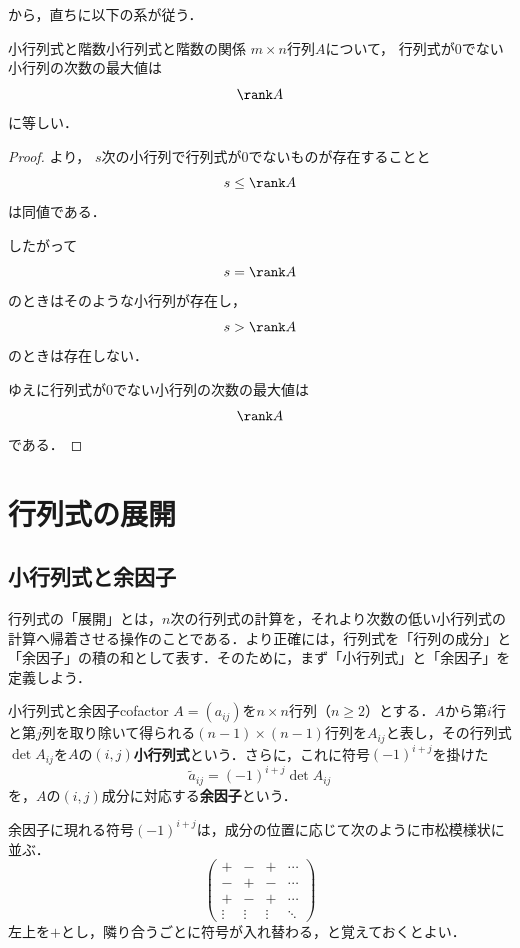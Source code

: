 から，直ちに以下の系が従う．

\begin{cor}{小行列式と階数}{小行列式と階数の関係}
  $m\times n$行列$A$について，
  行列式が$0$でない小行列の次数の最大値は
  \[
    \rank A
  \]
  に等しい．
\end{cor}

\begin{leftbar}
\begin{proof}
より，
$s$次の小行列で行列式が$0$でないものが存在することと
\[
s\le \rank A
\]
は同値である．

したがって
\[
s=\rank A
\]
のときはそのような小行列が存在し，
\[
s>\rank A
\]
のときは存在しない．

ゆえに行列式が$0$でない小行列の次数の最大値は
\[
\rank A
\]
である．
\end{proof}
\end{leftbar}

\section{行列式の展開}

\subsection{小行列式と余因子}

行列式の「展開」とは，$n$次の行列式の計算を，それより次数の低い小行列式の計算へ帰着させる操作のことである．より正確には，行列式を「行列の成分」と「余因子」の積の和として表す．そのために，まず「小行列式」と「余因子」を定義しよう．

\begin{definition}{小行列式と余因子}{cofactor}
  $A = (a_{ij})$を$n \times n$行列（$n \geq 2$）とする．$A$から第$i$行と第$j$列を取り除いて得られる$(n-1) \times (n-1)$行列を$A_{ij}$と表し，その行列式$\det A_{ij}$を$A$の$(i,j)$\textbf{小行列式}という．さらに，これに符号$(-1)^{i+j}$を掛けた
  \[
  \tilde{a}_{ij} = (-1)^{i+j} \det A_{ij}
  \]
  を，$A$の$(i,j)$成分に対応する\textbf{余因子}という．
\end{definition}

余因子に現れる符号$(-1)^{i+j}$は，成分の位置に応じて次のように市松模様状に並ぶ．
\[
\begin{pmatrix}
  + & - & + & \cdots \\
  - & + & - & \cdots \\
  + & - & + & \cdots \\
  \vdots & \vdots & \vdots & \ddots
\end{pmatrix}
\]
左上を$+$とし，隣り合うごとに符号が入れ替わる，と覚えておくとよい．



